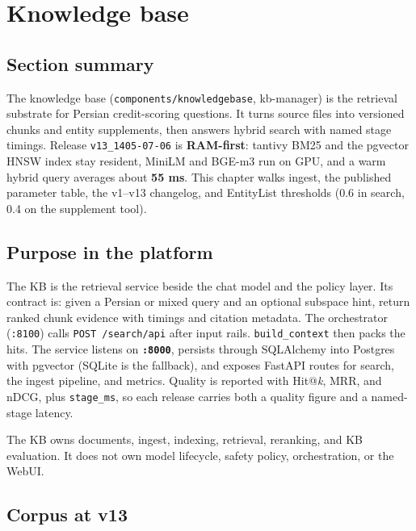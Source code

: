 \chapter{Knowledge base}\label{knowledge-base}

\section{Section summary}\label{section-summary}

The knowledge base (\texttt{components/knowledgebase}, kb-manager) is the retrieval substrate for Persian credit-scoring questions. It turns source files into versioned chunks and entity supplements, then answers hybrid search with named stage timings. Release \texttt{v13\_1405-07-06} is \textbf{RAM-first}: tantivy BM25 and the pgvector HNSW index stay resident, MiniLM and BGE-m3 run on GPU, and a warm hybrid query averages about \textbf{55 ms}. This chapter walks ingest, the published parameter table, the v1--v13 changelog, and EntityList thresholds (0.6 in search, 0.4 on the supplement tool).

\section{Purpose in the platform}\label{purpose-in-the-platform}

The KB is the retrieval service beside the chat model and the policy layer. Its contract is: given a Persian or mixed query and an optional subspace hint, return ranked chunk evidence with timings and citation metadata. The orchestrator (\texttt{:8100}) calls \texttt{POST\ /search/api} after input rails. \texttt{build\_context} then packs the hits. The service listens on \textbf{\texttt{:8000}}, persists through SQLAlchemy into Postgres with pgvector (SQLite is the fallback), and exposes FastAPI routes for search, the ingest pipeline, and metrics. Quality is reported with Hit@\emph{k}, MRR, and nDCG, plus \texttt{stage\_ms}, so each release carries both a quality figure and a named-stage latency.

The KB owns documents, ingest, indexing, retrieval, reranking, and KB evaluation. It does not own model lifecycle, safety policy, orchestration, or the WebUI.

\section{Corpus at v13}\label{corpus-at-v13}


